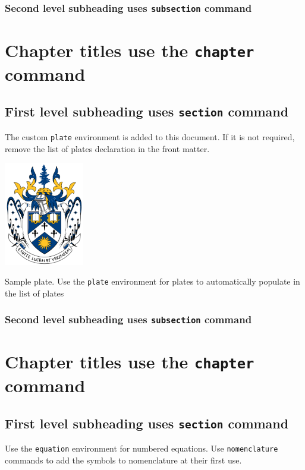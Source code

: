 \documentclass[openany, 12pt]{book}
\begin{document}
\subsection{Second level subheading uses \texttt{subsection} command}

\chapter{Chapter titles use the \texttt{chapter} command}

\section{First level subheading uses \texttt{section} command}

The custom \texttt{plate} environment is added to this document. If it is not required, remove the list of plates declaration in the front matter.

\begin{plate}
    \centering
    \includegraphics[width=3.5cm]{laurentian-university-coa.png}
    \caption{Sample plate. Use the \texttt{plate} environment for plates to automatically populate in the list of plates}
\end{plate}

\subsection{Second level subheading uses \texttt{subsection} command}

\chapter{Chapter titles use the \texttt{chapter} command}

\section{First level subheading uses \texttt{section} command}

Use the \texttt{equation} environment for numbered equations.
Use \texttt{nomenclature} commands to add the symbols to nomenclature at their first use.
\end{document}

